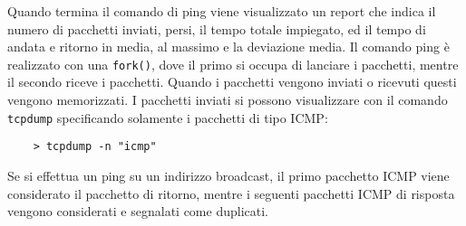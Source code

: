 \documentclass{article}
\numberwithin{equation}{subsection}
\begin{document}
Quando termina il comando di ping viene visualizzato un report che indica il numero di pacchetti inviati, persi, il tempo totale impiegato, ed il tempo di andata e 
ritorno in media, al massimo e la deviazione media. 
Il comando ping è realizzato con una \verb|fork()|, dove il primo si occupa di lanciare i pacchetti, mentre il secondo riceve i pacchetti. Quando i pacchetti vengono 
inviati o ricevuti questi vengono memorizzati. I pacchetti inviati si possono visualizzare con il comando \verb|tcpdump| specificando solamente i pacchetti di tipo ICMP:
\begin{verbatim}
    > tcpdump -n "icmp"
\end{verbatim}

Se si effettua un ping su un indirizzo broadcast, il primo pacchetto ICMP viene considerato il pacchetto di ritorno, mentre i seguenti pacchetti ICMP di risposta 
vengono considerati e segnalati come duplicati. 
\end{document}
